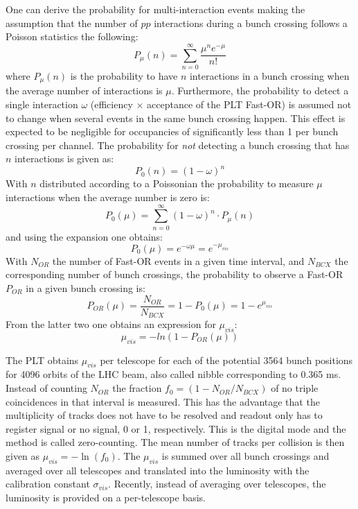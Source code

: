 One can derive the probability for multi-interaction events making the assumption that 
the number of $pp$ interactions during a bunch crossing follows a Poisson statistics the following:
\begin{equation}
P_{\mu}(n) = \sum_{n=0}^{\infty} \frac{\mu^n e^{-\mu}}{n!}
\end{equation}
where $P_\mu(n)$ is the probability to have $n$ interactions in a bunch crossing when the average 
number of interactions is $\mu$. Furthermore, the probability to detect a single interaction $\omega$ 
(efficiency $\times$ acceptance of the PLT Fast-OR) is assumed not to change when several events in the same 
bunch crossing happen. This effect is expected to be negligible for occupancies of significantly less than 1 per 
bunch crossing per channel. The probability for {\em not} detecting a bunch crossing
that has $n$ interactions is given as:
\begin{equation}
P_0(n) = (1 - \omega)^n 
\end{equation}
With $n$ distributed according to a Poissonian the probability to measure $\mu$ interactions
when the average number is zero is:
\begin{equation}
P_0(\mu) = \sum_{n=0}^{\infty} (1 - \omega)^n \cdot P_{\mu}(n)
\end{equation}
and using the expansion one obtains:
\begin{equation}
P_0(\mu) = e^{-\omega \mu} = e^{-\mu_{vis}}
\end{equation} 
With $N_{OR}$ the number of Fast-OR events in a given time interval, and $N_{BCX}$ the
corresponding number of bunch crossings, the probability to observe a Fast-OR $P_{OR}$ 
in a given bunch crossing is:
\begin{equation}
P_{OR}(\mu) = \frac{N_{OR}}{N_{BCX}} = 1 - P_0(\mu) = 1 - e^{\mu_{vis}}
\end{equation} 
From the latter two one obtains an expression for $\mu_{vis}$:
\begin{equation}
\mu_{vis} = - ln(1 - P_{OR}(\mu))
\end{equation}
 

The PLT obtains $\mu_{vis}$ per telescope for each of the potential 3564 bunch positions  
for 4096 orbits of the LHC beam, also called nibble corresponding to 0.365 ms.
Instead of counting $N_{OR}$ the fraction $f_0 = (1 - N_{OR}/N_{BCX})$ of no triple coincidences
in that interval is measured. This has the advantage that the multiplicity of tracks does not have
to be resolved and readout only has to register signal or no signal, 0 or 1, respectively.
This is the digital mode and the method is called zero-counting. The mean number of tracks per collision 
is then given as $\mu_{vis} = -\ln ( f_0 )$.
The $\mu_{vis}$ is summed over all bunch crossings and averaged over all telescopes
and translated into the luminosity with the calibration constant $\sigma_{vis}$.
Recently, instead of averaging over telescopes, the luminosity is provided on a per-telescope basis.




